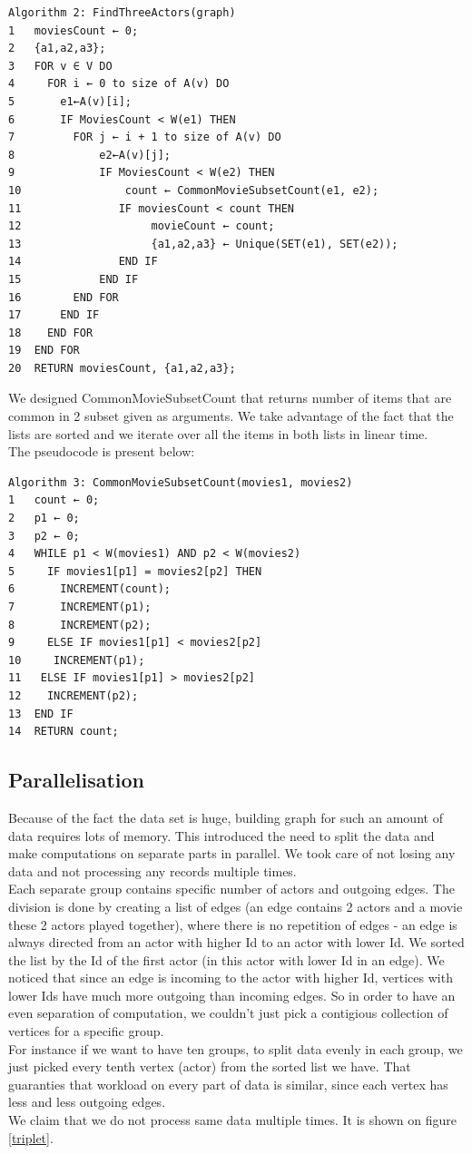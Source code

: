 \begin{verbatim}
Algorithm 2: FindThreeActors(graph)
1	moviesCount ← 0;
2	{a1,a2,a3};
3	FOR v ∈ V DO
4	  FOR i ← 0 to size of A(v) DO
5	    e1←A(v)[i];
6	    IF MoviesCount < W(e1) THEN
7	      FOR j ← i + 1 to size of A(v) DO	          
8	          e2←A(v)[j];
9	          IF MoviesCount < W(e2) THEN
10	              count ← CommonMovieSubsetCount(e1, e2);
11	             IF moviesCount < count THEN
12	                  movieCount ← count;
13	                  {a1,a2,a3} ← Unique(SET(e1), SET(e2));
14	             END IF
15	          END IF
16	      END FOR
17	    END IF
18	  END FOR
19	END FOR
20	RETURN moviesCount, {a1,a2,a3};	  	                    	  
\end{verbatim}


We designed CommonMovieSubsetCount that returns number of items that are common in 2 subset given as arguments. We take advantage of the fact that the lists are sorted and we iterate over all the items in both lists in linear time. 
\\
The pseudocode is present below:

\begin{verbatim}
Algorithm 3: CommonMovieSubsetCount(movies1, movies2)
1	count ← 0;
2	p1 ← 0;
3	p2 ← 0;
4	WHILE p1 < W(movies1) AND p2 < W(movies2)
5	  IF movies1[p1] = movies2[p2] THEN
6	    INCREMENT(count);
7	    INCREMENT(p1);
8	    INCREMENT(p2);
9	  ELSE IF movies1[p1] < movies2[p2]
10	   INCREMENT(p1);
11	 ELSE IF movies1[p1] > movies2[p2]
12	  INCREMENT(p2);
13	END IF
14	RETURN count;
\end{verbatim}

\subsection{Parallelisation}
\label{Parallelism}
Because of the fact the data set is huge, building graph for such an amount of data requires lots of memory. This introduced the need to split the data and make computations on separate parts in parallel. We took care of not losing any data and not processing any records multiple times.
\\
Each separate group contains specific number of actors and outgoing edges. The division is done by creating a list of edges (an edge contains 2 actors and a movie these 2 actors played together), where there is no repetition of edges - an edge is always directed from an actor with higher Id to an actor with lower Id. We sorted the list by the Id of the first actor (in this actor with lower Id in an edge). We noticed that since an edge is incoming to the actor with higher Id, vertices with lower Ids have much more outgoing than incoming edges. So in order to have an even separation of computation, we couldn't just pick a contigious collection of vertices for a specific group.
\\
For instance if we want to have ten groups, to split data evenly in each group, we just picked every tenth vertex (actor) from the sorted list we have. That guaranties that workload on every part of data is similar, since each vertex has less and less outgoing edges.
\\
We claim that we do not process same data multiple times. It is shown on figure \ref{triplet}.

